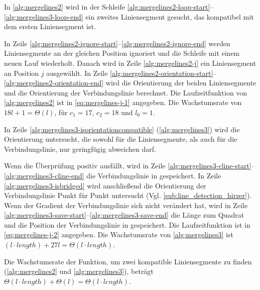 In \autoref{alg:mergelines2} wird in der Schleife \ref{alg:mergelines2-loop-start}--\ref{alg:mergelines3-loop-end} ein
 zweites Liniensegment gesucht, das kompatibel mit dem ersten Liniensegment ist.

In Zeile \ref{alg:mergelines2-ignore-start}--\ref{alg:mergelines2-ignore-end} werden Liniensegmente an der gleichen
 Position ignoriert und die Schleife mit einem neuen Lauf wiederholt. Danach wird in Zeile \ref{alg:mergelines2-j} ein
 Liniensegment an Position $j$ ausgewählt. In Zeile
 \ref{alg:mergelines2-orientation-start}--\ref{alg:mergelines2-orientation-end} wird die Orientierung der beiden
 Liniensegmente und die Orientierung der Verbindungslinie berechnet. Die Laufzeitfunktion von \autoref{alg:mergelines2}
 ist in \autoref{eq:mergelines-j-1} angegeben. Die Wachstumsrate von $18l + 1 = \Theta(l)$, für $c_{1} = 17$,
 $c_{2} = 18$ und $l_{0} = 1$.

In Zeile \ref{alg:mergelines3-isorientationcompatible} (\autoref{alg:mergelines3}) wird die Orientierung untersucht,
 die sowohl für die Liniensegmente, als auch für die Verbindungslinie, nur geringfügig abweichen darf.

Wenn die Überprüfung positiv ausfällt, wird in Zeile \ref{alg:mergelines3-cline-start}--\ref{alg:mergelines3-cline-end}
 die Verbindungslinie in  gespeichert. In Zeile \ref{alg:mergelines3-isbridged} wird anschließend die
 Orientierung der Verbindungslinie Punkt für Punkt untersucht (Vgl. \autoref{sub:line_detection_hirzer}). Wenn der
 Gradient der Verbindungslinie sich nicht verändert hat, wird in Zeile
 \ref{alg:mergelines3-save-start}--\ref{alg:mergelines3-save-end} die Länge zum Quadrat und die Position der
 Verbindungslinie in  gespeichert. Die Laufzeitfunktion ist in \autoref{eq:mergelines-j-2}
 angegeben. Die Wachstumsrate von \autoref{alg:mergelines3} ist
 $(l \cdot \mathit{length}) + 27l = \Theta(l \cdot \mathit{length})$.

Die Wachstumsrate der Funktion, um zwei kompatible Liniensegmente zu finden (\autoref{alg:mergelines2} und
 \autoref{alg:mergelines3}), beträgt $\Theta(l \cdot \mathit{length}) + \Theta(l) = \Theta(l \cdot \mathit{length})$.

